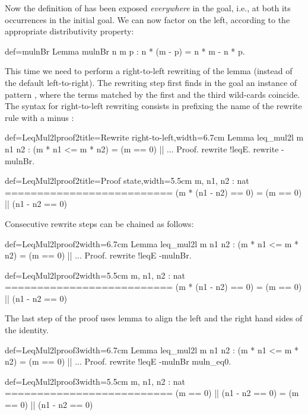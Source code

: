 Now the definition of \C{<=} has been exposed
\emph{everywhere} in the goal, i.e., at both its occurrences in the
initial goal. We can now factor  on the left, according to the
appropriate distributivity property:

\begin{coq}{def=mulnBr}{}
Lemma mulnBr n m p : n * (m - p) = n * m - n * p.
\end{coq}

This time we need to perform a right-to-left rewriting of the
 lemma (instead of the
default left-to-right). The rewriting step first finds in the goal an
instance of pattern \C{(_ * _ - _ * _)}, where the terms matched by
the first and the third wild-cards coincide. The syntax for
right-to-left rewriting consists in prefixing the
name of the rewrite rule
with a minus \C{-}:


\begin{coq}{def=LeqMul2lproof2}{title=Rewrite right-to-left,width=6.7cm}
Lemma leq_mul2l m n1 n2 :
 (m * n1 <= m * n2) = (m == 0) || ...
Proof.
rewrite !leqE. rewrite -mulnBr.
\end{coq}
\begin{coqout}{def=LeqMul2lproof2}{title=Proof state,width=5.5cm}
m, n1, n2 : nat
==========================
(m * (n1 - n2) == 0) =
  (m == 0) || (n1 - n2 == 0)
\end{coqout}
Consecutive rewrite steps can be chained as follows:

\begin{coq}{def=LeqMul2lproof2}{width=6.7cm}
Lemma leq_mul2l m n1 n2 :
 (m * n1 <= m * n2) = (m == 0) || ...
Proof.
rewrite !leqE -mulnBr.
\end{coq}
\begin{coqout}{def=LeqMul2lproof2}{width=5.5cm}
m, n1, n2 : nat
==========================
(m * (n1 - n2) == 0) =
  (m == 0) || (n1 - n2 == 0)
\end{coqout}
The last step of the proof uses lemma  to align the left
and the right hand sides of the identity.

\begin{coq}{def=LeqMul2lproof3}{width=6.7cm}
Lemma leq_mul2l m n1 n2 :
 (m * n1 <= m * n2) = (m == 0) || ...
Proof.
rewrite !leqE -mulnBr muln_eq0.
\end{coq}
\begin{coqout}{def=LeqMul2lproof3}{width=5.5cm}
m, n1, n2 : nat
==========================
(m == 0) || (n1 - n2 == 0) =
  (m == 0) || (n1 - n2 == 0)
\end{coqout}

